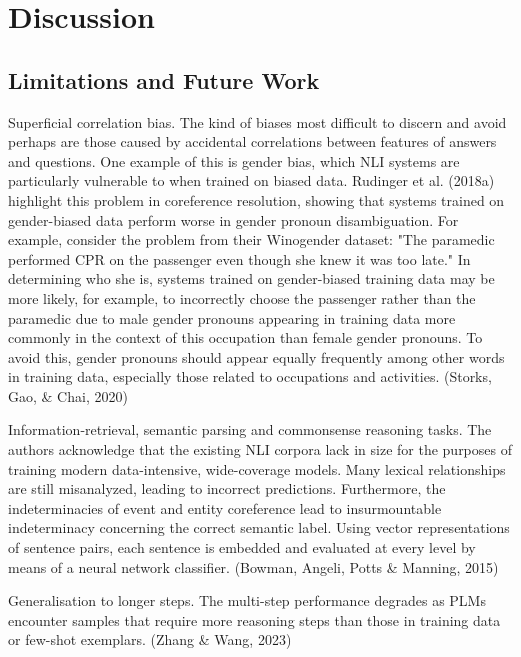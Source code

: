 \documentclass[fleqn,moreauthors,10pt]{ds_report}
\begin{document}
\section*{Discussion}

\subsection*{Limitations and Future Work}

Superficial correlation bias. The kind of biases most difficult to discern and avoid perhaps are those caused by accidental correlations between features of answers and questions. One example of this is gender bias, which NLI systems are particularly vulnerable to when trained on biased data. Rudinger et al. (2018a) highlight this problem in coreference resolution, showing that systems trained on gender-biased data perform worse in gender pronoun disambiguation. For example, consider the problem from their Winogender dataset: "The paramedic performed CPR on the passenger even though she knew it was too late." In determining who she is, systems trained on gender-biased training data may be more likely, for example, to incorrectly choose the passenger rather than the paramedic due to male gender pronouns appearing in training data more commonly in the context of this occupation than female gender pronouns. To avoid this, gender pronouns should appear equally frequently among other words in training data, especially those related to occupations and activities. (Storks, Gao, \& Chai, 2020)

Information-retrieval, semantic parsing and commonsense reasoning tasks. The authors acknowledge that the existing NLI corpora lack in size for the purposes of training modern data-intensive, wide-coverage models. Many lexical relationships are still misanalyzed, leading to incorrect predictions. Furthermore, the indeterminacies of event and entity coreference lead to insurmountable indeterminacy concerning the correct semantic label. Using vector representations of sentence pairs, each sentence is embedded and evaluated at every level by means of a neural network classifier. (Bowman, Angeli, Potts \& Manning, 2015)

Generalisation to longer steps. The multi-step performance degrades as PLMs encounter samples that require more reasoning steps than those in training data or few-shot exemplars. (Zhang \& Wang, 2023)
\end{document}
